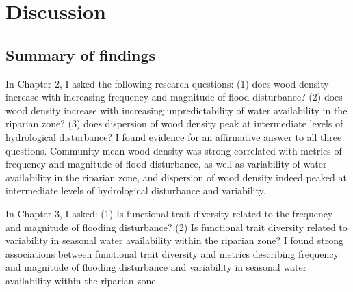 \documentclass[openright,12pt,a4paper]{memoir}
\begin{document}
\chapter[Discussion]{Discussion}
\newpage


\section{Summary of findings}
In Chapter 2, I asked the following research questions: (1) does wood density increase with increasing frequency and magnitude of flood disturbance? (2) does wood density increase with increasing unpredictability of water availability in the riparian zone? (3) does dispersion of wood density peak at intermediate levels of hydrological disturbance? I found evidence for an affirmative answer to all three questions. Community mean wood density was strong correlated with metrics of frequency and magnitude of flood disturbance, as well as variability of water availability in the riparian zone, and dispersion of wood density indeed peaked at intermediate levels of hydrological disturbance and variability.

In Chapter 3, I asked: (1) Is functional trait diversity related to the frequency and magnitude of flooding disturbance? (2) Is functional trait diversity related to variability in seasonal water availability within the riparian zone? I found strong associations between functional trait diversity and metrics describing frequency and magnitude of flooding disturbance and variability in seasonal water availability within the riparian zone.
\end{document}
